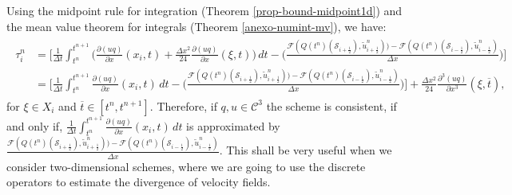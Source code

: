 Using the midpoint rule for integration (Theorem \ref{prop-bound-midpoint1d}) and the mean value theorem for integrals
(Theorem \ref{anexo-numint-mv}), 
we have:
\begin{align}
	\begin{split}
		\label{consistency-1d-eq3}
		\tau_{i}^n 
		&= 
		\bigg[ \frac{1}{\Delta t}  \int_{t^{n}}^{t^{n+1}}
		{\bigg(\frac{\partial (uq)}{\partial x}}(x_i, t) + \frac{\Delta x^2}{24}\frac{\partial (uq)}{\partial x}(\xi, t) \bigg) \,dt - 
		\bigg(\frac{\mathcal{F}(Q(t^n)(\mathcal{S}_{i+\frac{1}{2}}),\tilde{u}^n_{i+\frac{1}{2}})) 
		-\mathcal{F}(Q(t^n)(\mathcal{S}_{i-\frac{1}{2}}),\tilde{u}^n_{i-\frac{1}{2}})}{\Delta x} \bigg)
		\bigg] \\
		& = 
		\bigg[ \frac{1}{\Delta t}  \int_{t^{n}}^{t^{n+1}}
		{\frac{\partial (uq)}{\partial x}}(x_i, t) \,dt - 
		\bigg(\frac{\mathcal{F}(Q(t^n)(\mathcal{S}_{i+\frac{1}{2}}),\tilde{u}^n_{i+\frac{1}{2}})) -\mathcal{F}(Q(t^n)(\mathcal{S}_{i-\frac{1}{2}}),\tilde{u}^n_{i-\frac{1}{2}})}{\Delta x} \bigg)
		\bigg] +  \frac{\Delta x^2}{24}\frac{\partial^3 (uq)}{\partial x^3}(\xi, \overline{t}), 
	\end{split}
\end{align}
for $\xi \in X_i$ and $\overline{t} \in [t^{n},t^{n+1}]$. Therefore, if $q,u \in \mathcal{C}^3$ the scheme is
consistent, if and only if, $\frac{1}{\Delta t}  \int_{t^{n}}^{t^{n+1}} {\frac{\partial (uq)}{\partial x}}(x_i, t) \,dt$
is approximated by 
$\frac{\mathcal{F}(Q(t^n)(\mathcal{S}_{i+\frac{1}{2}}),\tilde{u}^n_{i+\frac{1}{2}})) -\mathcal{F}(Q(t^n)(\mathcal{S}_{i-\frac{1}{2}} ),\tilde{u}^n_{i-\frac{1}{2}})}{\Delta x}$.
This shall be very useful when we consider two-dimensional schemes, where we are going to use the discrete operators to estimate the divergence
of velocity fields.

